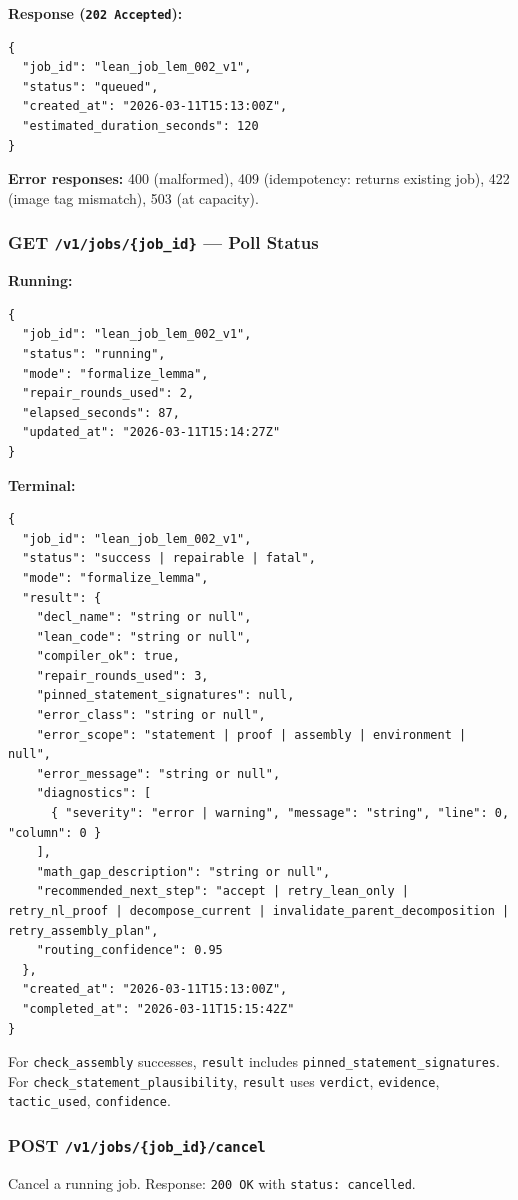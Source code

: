 \documentclass[11pt,a4paper]{article}
\begin{document}
\textbf{Response (\texttt{202 Accepted}):}
\begin{lstlisting}
{
  "job_id": "lean_job_lem_002_v1",
  "status": "queued",
  "created_at": "2026-03-11T15:13:00Z",
  "estimated_duration_seconds": 120
}
\end{lstlisting}

\textbf{Error responses:} 400 (malformed), 409 (idempotency: returns existing job), 422 (image tag mismatch), 503 (at capacity).

\subsubsection{GET \texttt{/v1/jobs/\{job\_id\}} --- Poll Status}

\textbf{Running:}
\begin{lstlisting}
{
  "job_id": "lean_job_lem_002_v1",
  "status": "running",
  "mode": "formalize_lemma",
  "repair_rounds_used": 2,
  "elapsed_seconds": 87,
  "updated_at": "2026-03-11T15:14:27Z"
}
\end{lstlisting}

\textbf{Terminal:}
\begin{lstlisting}
{
  "job_id": "lean_job_lem_002_v1",
  "status": "success | repairable | fatal",
  "mode": "formalize_lemma",
  "result": {
    "decl_name": "string or null",
    "lean_code": "string or null",
    "compiler_ok": true,
    "repair_rounds_used": 3,
    "pinned_statement_signatures": null,
    "error_class": "string or null",
    "error_scope": "statement | proof | assembly | environment | null",
    "error_message": "string or null",
    "diagnostics": [
      { "severity": "error | warning", "message": "string", "line": 0, "column": 0 }
    ],
    "math_gap_description": "string or null",
    "recommended_next_step": "accept | retry_lean_only | retry_nl_proof | decompose_current | invalidate_parent_decomposition | retry_assembly_plan",
    "routing_confidence": 0.95
  },
  "created_at": "2026-03-11T15:13:00Z",
  "completed_at": "2026-03-11T15:15:42Z"
}
\end{lstlisting}

For \texttt{check\_assembly} successes, \texttt{result} includes \texttt{pinned\_statement\_signatures}. For \texttt{check\_statement\_plausibility}, \texttt{result} uses \texttt{verdict}, \texttt{evidence}, \texttt{tactic\_used}, \texttt{confidence}.

\subsubsection{POST \texttt{/v1/jobs/\{job\_id\}/cancel}}
Cancel a running job. Response: \texttt{200 OK} with \texttt{status: cancelled}.
\end{document}
